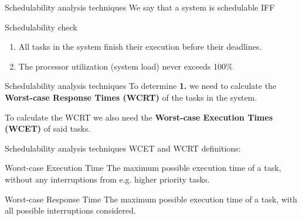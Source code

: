 \begin{frame}{Schedulability analysis techniques}
    We say that a system is schedulable IFF
    \begin{block}{Schedulability check}
        \begin{enumerate}
            \item All tasks in the system finish their execution before their deadlines.
            \item The processor utilization (system load) never exceeds 100\%
        \end{enumerate}
    \end{block}
\end{frame}

\begin{frame}{Schedulability analysis techniques}
    To determine \textbf{1.} we need to calculate the \textbf{Worst-case Response
    Times (WCRT)} of the tasks in the system.

    \vspace{1cm}

    To calculate the WCRT we also need the \textbf{Worst-case Execution Times (WCET)} of
    said tasks.

\end{frame}

\begin{frame}{Schedulability analysis techniques}
    WCET and WCRT definitions:
    \vspace{1em}

    \begin{block}{Worst-case Execution Time}
        The maximum possible execution time of a task, without any
        interruptions from e.g. higher priority tasks.
    \end{block}

    \vspace{1em}

    \begin{block}{Worst-case Response Time}
        The maximum possible execution time of a task, with all
        possible interruptions considered.
    \end{block}
\end{frame}

